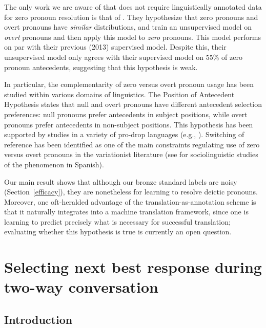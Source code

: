 \documentclass[11pt]{report}
\renewcommand\cite{\citep}	%
\begin{document}
The only work we are aware of that does not require linguistically annotated data for zero pronoun resolution is that of \cite{chenchinese}. They hypothesize that zero pronouns and overt pronouns have \emph{similar} distributions, and train an unsupervised model on \emph{overt} pronouns and then apply this model to \emph{zero} pronouns. This model performs on par with their previous (2013) supervised model. Despite this, their unsupervised model only agrees with their supervised model on 55\% of zero pronoun antecedents, suggesting that this hypothesis is weak.

In particular, the complementarity of zero versus overt pronoun usage has been studied within various domains of linguistics. The Position of Antecedent Hypothesis \cite{carminati2002processing} states that null and overt pronouns have different antecedent selection preferences: null pronouns prefer antecedents in subject positions, while overt pronouns prefer antecedents in non-subject positions. This hypothesis has been supported by studies in a variety of pro-drop languages (e.g., \cite{alonso2002null} \cite{kweon2011processing}). Switching of reference has been identified as one of the main constraints regulating use of zero versus overt pronouns in the variationist literature (see \cite{cameron1992pronominal} for sociolinguistic studies of the phenomenon in Spanish).%

Our main result shows that although our bronze standard labels are noisy (Section~\ref{efficacy}), they are nonetheless for learning to resolve deictic pronouns. Moreover, one oft-heralded advantage of the translation-as-annotation scheme \cite{carpuat07psd} is that it naturally integrates into a machine translation framework, since one is learning to predict precisely what is necessary for successful translation; evaluating whether this hypothesis is true is currently an open question.


\newpage

\chapter{Selecting next best response during two-way conversation}\label{dialogue_next_response}

\section{Introduction}
\end{document}

